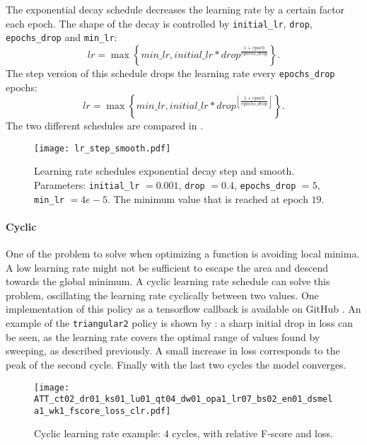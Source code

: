 The exponential decay schedule decreases the learning rate by a certain factor
each epoch. The shape of the decay is controlled by \texttt{initial\_lr},
\texttt{drop}, \texttt{epochs\_drop} and \texttt{min\_lr}:
\begin{equation}
    lr =
    \max \left\{ 
        min\_lr,
        initial\_lr * drop ^{ \frac{1 + epoch}{epochs\_drop} }
    \right\}
    .
    \label{eq:lr_smooth}
\end{equation}
The step version of this schedule drops the learning rate every
\texttt{epochs\_drop} epochs:
\begin{equation}
    lr =
    \max \left\{ 
        min\_lr,
        initial\_lr * drop ^{
            \left\lfloor 
                \frac{1 + epoch}{epochs\_drop}
            \right\rfloor
        }
    \right\}
    .
    \label{eq:lr_step}
\end{equation}
The two different schedules are compared in .
\begin{figure}[t!]
    \centering
    \texttt{[image: lr\_step\_smooth.pdf]}
    \caption{Learning rate schedules exponential decay step and smooth.
        Parameters:
        \texttt{initial\_lr} $=0.001$,
        \texttt{drop} $=0.4$,
        \texttt{epochs\_drop} $=5$,
        \texttt{min\_lr} $=4e-5$.
        The minimum value that is reached at epoch $19$.}%
    \label{fig:lr_step_smooth}
\end{figure}

\paragraph{Cyclic}

One of the problem to solve when optimizing a function is avoiding local minima.
A low learning rate might not be sufficient to escape the area and descend
towards the global minimum.
A cyclic learning rate schedule \cite{smith2017cyclical} can solve this problem,
oscillating the learning rate cyclically between two values.
One implementation of this policy as a tensorflow callback is available on
GitHub \cite{bckenstlerCLR}.
An example of the \texttt{triangular2} policy is shown by
: a sharp initial drop in loss can be seen, as the
learning rate covers the optimal range of values found by sweeping, as
described previously. A small increase in loss corresponds to the peak of the
second cycle. Finally with the last two cycles the model converges.

\begin{figure}[t!]
    \centering
    \texttt{[image: ATT\_ct02\_dr01\_ks01\_lu01\_qt04\_dw01\_opa1\_lr07\_bs02\_en01\_dsmela1\_wk1\_fscore\_loss\_clr.pdf]}
    \caption{Cyclic learning rate example: $4$ cycles, with relative F-score and loss.}%
    \label{fig:cyclic_lr_example}
\end{figure}

